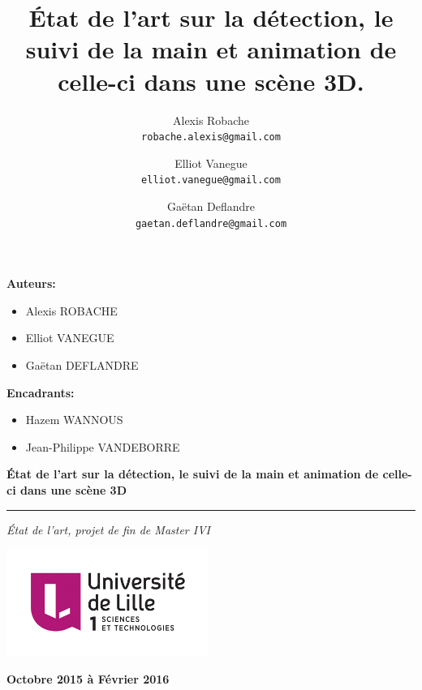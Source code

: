 \documentclass{article}
\title{État de l'art sur la détection, le suivi de la main et animation de celle-ci dans une scène 3D.}
\author{
Alexis Robache \\
\texttt{robache.alexis@gmail.com} \\
\and
Elliot Vanegue\\
\texttt{elliot.vanegue@gmail.com} \\
\and
Gaëtan Deflandre\\
\texttt{gaetan.deflandre@gmail.com} \\
}
\begin{document}

\begin{multicols}{2}  

    \textbf{Auteurs:}
    \begin{itemize}
      \item Alexis ROBACHE
      \item Elliot VANEGUE
      \item Gaëtan DEFLANDRE
    \end{itemize}
    
    \textbf{Encadrants:}\\
    \begin{itemize}
      \item Hazem WANNOUS
      \item Jean-Philippe VANDEBORRE 
    \end{itemize}

\end{multicols}

\vspace{3cm}

 \begin{flushright}
  \begin{spacing}{1.6}
    \textbf{
      {\Large État de l'art sur la détection, le suivi de la main et 
        animation de celle-ci dans une scène 3D}
    }
  \end{spacing}
  \hrule
  \vspace{0.2cm}
  \textit{
  	{\large\textcolor{mygray}{État de l'art, projet de fin de Master IVI}}
  }
\end{flushright}

\vspace{3cm}

\begin{center}
  \includegraphics[height=3.5cm]{images/logoLILLE1.jpg}
  \hfill
  \vspace{3cm}

  \vspace{1cm}
  {\large\textbf{Octobre 2015 à Février 2016}}
\end{center}
\end{document}
